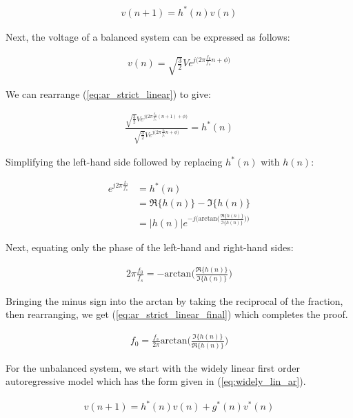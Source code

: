 \begin{align}
v(n+1)=h^*(n)v(n) \label{eq:ar_strict_linear}
\end{align}

\noindent{}Next, the voltage of a balanced system can be expressed as follows:

\begin{align*}
v(n) = \sqrt{\frac{3}{2}}Ve^{j\big(2\pi\frac{f_0}{f_s}n+\phi\big)}
\end{align*}

\noindent{}We can rearrange (\ref{eq:ar_strict_linear}) to give:

\begin{align*}
\frac{\sqrt{\frac{3}{2}}Ve^{j\big(2\pi\frac{f_0}{f_s}(n+1)+\phi\big)}}{\sqrt{\frac{3}{2}}Ve^{j\big(2\pi\frac{f_0}{f_s}n+\phi\big)}} = h^*(n)
\end{align*}

\noindent{}Simplifying the left-hand side followed by replacing $h^*(n)$ with $h(n)$:

\begin{align*}
e^{j2\pi\frac{f_0}{f_s}} &= h^*(n)\\
&=\Re\{h(n)\} - \Im\{h(n)\} \\
&=|h(n)|e^{-j\big(\text{arctan}\big(\frac{\Re\{h(n)\}}{\Im\{h(n)\}}\big)\big)}
\end{align*}

\noindent{}Next, equating only the phase of the left-hand and right-hand sides:

\begin{align*}
2\pi\frac{f_0}{f_s} = -\text{arctan}\bigg(\frac{\Re\{h(n)\}}{\Im\{h(n)\}}\bigg)
\end{align*}

\noindent{}Bringing the minus sign into the arctan by taking the reciprocal of the fraction, then rearranging, we get (\ref{eq:ar_strict_linear_final}) which completes the proof.

\begin{align}
f_0 = \frac{f_s}{2\pi}\text{arctan}\bigg(\frac{\Im\{h(n)\}}{\Re\{h(n)\}}\bigg) \label{eq:ar_strict_linear_final}
\end{align}

\noindent{}For the unbalanced system, we start with the widely linear first order autoregressive model which has the form given in (\ref{eq:widely_lin_ar}).

\begin{align}
v(n+1) = h^*(n)v(n) + g^*(n) v^*(n) \label{eq:widely_lin_ar}
\end{align}


